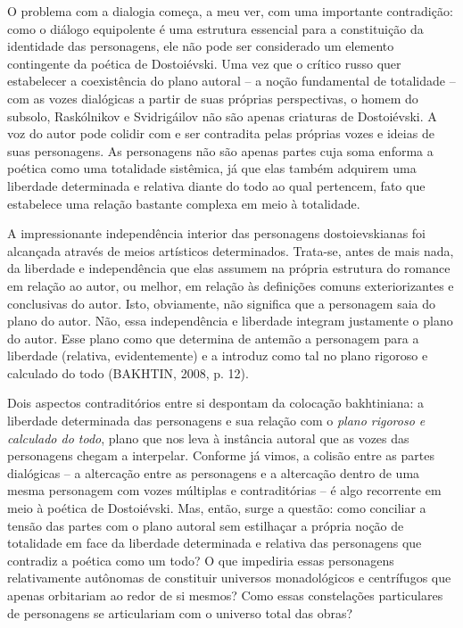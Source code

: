 O problema com a dialogia começa, a meu ver, com uma importante
contradição: como o diálogo equipolente é uma estrutura essencial para a
constituição da identidade das personagens, ele não pode ser considerado
um elemento contingente da poética de Dostoiévski. Uma vez que o crítico
russo quer estabelecer a coexistência do plano autoral -- a noção
fundamental de totalidade -- com as vozes dialógicas a partir de suas
próprias perspectivas, o homem do subsolo, Raskólnikov e Svidrigáilov
não são apenas criaturas de Dostoiévski. A voz do autor pode colidir com
e ser contradita pelas próprias vozes e ideias de suas personagens. As
personagens não são apenas partes cuja soma enforma a poética como uma
totalidade sistêmica, já que elas também adquirem uma liberdade
determinada e relativa diante do todo ao qual pertencem, fato que
estabelece uma relação bastante complexa em meio à totalidade.

A impressionante independência interior das personagens dostoievskianas
foi alcançada através de meios artísticos determinados. Trata-se, antes
de mais nada, da liberdade e independência que elas assumem na própria
estrutura do romance em relação ao autor, ou melhor, em relação às
definições comuns exteriorizantes e conclusivas do autor. Isto,
obviamente, não significa que a personagem saia do plano do autor. Não,
essa independência e liberdade integram justamente o plano do autor.
Esse plano como que determina de antemão a personagem para a liberdade
(relativa, evidentemente) e a introduz como tal no plano rigoroso e
calculado do todo (BAKHTIN, 2008, p. 12).

Dois aspectos contraditórios entre si despontam da colocação
bakhtiniana: a liberdade determinada das personagens e sua relação com o
\emph{plano rigoroso e calculado do todo}, plano que nos leva à
instância autoral que as vozes das personagens chegam a interpelar.
Conforme já vimos, a colisão entre as partes dialógicas -- a altercação
entre as personagens e a altercação dentro de uma mesma personagem com
vozes múltiplas e contraditórias -- é algo recorrente em meio à poética
de Dostoiévski. Mas, então, surge a questão: como conciliar a tensão das
partes com o plano autoral sem estilhaçar a própria noção de totalidade
em face da liberdade determinada e relativa das personagens que
contradiz a poética como um todo? O que impediria essas personagens
relativamente autônomas de constituir universos monadológicos e
centrífugos que apenas orbitariam ao redor de si mesmos? Como essas
constelações particulares de personagens se articulariam com o universo
total das obras?

